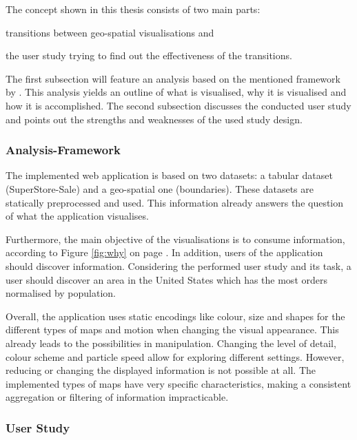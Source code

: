 \cbstart
The concept shown in this thesis consists of two main parts:
\begin{enumerate*}[label={(\arabic*)}]
\item transitions between geo-spatial visualisations and
\item the user study trying to find out the effectiveness of the transitions.
\end{enumerate*}

The first subsection will feature an analysis based on the mentioned framework by \citeauthor{Munzner2014}. This analysis yields an outline of what is visualised, why it is visualised and how it is accomplished. The second subsection discusses the conducted user study and points out the strengths and weaknesses of the used study design.
\cbend

\subsubsection{Analysis-Framework}
The implemented web application is based on two datasets: a tabular dataset (SuperStore-Sale) and a geo-spatial one (boundaries). These datasets are statically preprocessed and used. This information already answers the question of what the application visualises.

\cbstart
Furthermore, the main objective of the visualisations is to consume information, according to Figure \ref{fig:why} on page \pageref{fig:why}. In addition, users of the application should discover information. Considering the performed user study and its task, a user should discover an area in the United States which has the most orders normalised by population.
\cbend

Overall, the application uses static encodings like colour, size and shapes for the different types of maps and motion when changing the visual appearance. This already leads to the possibilities in manipulation. Changing the level of detail, colour scheme and particle speed allow for exploring different settings. However, reducing or changing the displayed information is not possible at all. The implemented types of maps have very specific characteristics, making a consistent aggregation or filtering of information impracticable.

\newpage
\subsubsection{User Study}
\label{s:discussion-study}
